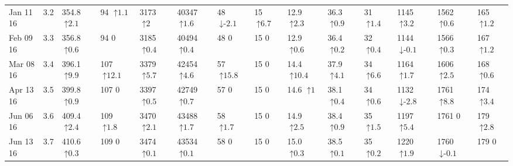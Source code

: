 \begin{tabular}{ll|llllll|lll|lll}
Jan 11 16 & 3.2 & 354.8 {\tiny $\uparrow\text{2.1}$} & 94 {\tiny $\uparrow\text{1.1}$} & 3173 {\tiny $\uparrow\text{2}$} & 40347 {\tiny $\uparrow\text{1.6}$} & 48 {\tiny $\downarrow\text{-}\text{2.1}$} & 15 {\tiny $\uparrow\text{6.7}$} & 12.9 {\tiny $\uparrow\text{2.3}$} & 36.3 {\tiny $\uparrow\text{0.9}$} & 31 {\tiny $\uparrow\text{1.4}$} & 1145 {\tiny $\uparrow\text{3.2}$} & 1562 {\tiny $\uparrow\text{0.6}$} & 165 {\tiny $\uparrow\text{1.2}$} \\
Feb 09 16 & 3.3 & 356.8 {\tiny $\uparrow\text{0.6}$} & 94 {\tiny $\text{0}$} & 3185 {\tiny $\uparrow\text{0.4}$} & 40494 {\tiny $\uparrow\text{0.4}$} & 48 {\tiny $\text{0}$} & 15 {\tiny $\text{0}$} & 12.9 {\tiny $\uparrow\text{0.6}$} & 36.4 {\tiny $\uparrow\text{0.2}$} & 32 {\tiny $\uparrow\text{0.4}$} & 1144 {\tiny $\downarrow\text{-}\text{0.1}$} & 1566 {\tiny $\uparrow\text{0.3}$} & 167 {\tiny $\uparrow\text{1.2}$} \\
Mar 08 16 & 3.4 & 396.1 {\tiny $\uparrow\text{9.9}$} & 107 {\tiny $\uparrow\text{12.1}$} & 3379 {\tiny $\uparrow\text{5.7}$} & 42454 {\tiny $\uparrow\text{4.6}$} & 57 {\tiny $\uparrow\text{15.8}$} & 15 {\tiny $\text{0}$} & 14.4 {\tiny $\uparrow\text{10.4}$} & 37.9 {\tiny $\uparrow\text{4.1}$} & 34 {\tiny $\uparrow\text{6.6}$} & 1164 {\tiny $\uparrow\text{1.7}$} & 1606 {\tiny $\uparrow\text{2.5}$} & 168 {\tiny $\uparrow\text{0.6}$} \\
Apr 13 16 & 3.5 & 399.8 {\tiny $\uparrow\text{0.9}$} & 107 {\tiny $\text{0}$} & 3397 {\tiny $\uparrow\text{0.5}$} & 42749 {\tiny $\uparrow\text{0.7}$} & 57 {\tiny $\text{0}$} & 15 {\tiny $\text{0}$} & 14.6 {\tiny $\uparrow\text{1}$} & 38.1 {\tiny $\uparrow\text{0.4}$} & 34 {\tiny $\uparrow\text{0.6}$} & 1132 {\tiny $\downarrow\text{-}\text{2.8}$} & 1761 {\tiny $\uparrow\text{8.8}$} & 174 {\tiny $\uparrow\text{3.4}$} \\
Jun 06 16 & 3.6 & 409.4 {\tiny $\uparrow\text{2.4}$} & 109 {\tiny $\uparrow\text{1.8}$} & 3470 {\tiny $\uparrow\text{2.1}$} & 43488 {\tiny $\uparrow\text{1.7}$} & 58 {\tiny $\uparrow\text{1.7}$} & 15 {\tiny $\text{0}$} & 14.9 {\tiny $\uparrow\text{2.5}$} & 38.4 {\tiny $\uparrow\text{0.9}$} & 35 {\tiny $\uparrow\text{1.5}$} & 1197 {\tiny $\uparrow\text{5.4}$} & 1761 {\tiny $\text{0}$} & 179 {\tiny $\uparrow\text{2.8}$} \\
Jun 13 16 & 3.7 & 410.6 {\tiny $\uparrow\text{0.3}$} & 109 {\tiny $\text{0}$} & 3474 {\tiny $\uparrow\text{0.1}$} & 43534 {\tiny $\uparrow\text{0.1}$} & 58 {\tiny $\text{0}$} & 15 {\tiny $\text{0}$} & 15.0 {\tiny $\uparrow\text{0.3}$} & 38.5 {\tiny $\uparrow\text{0.1}$} & 35 {\tiny $\uparrow\text{0.2}$} & 1220 {\tiny $\uparrow\text{1.9}$} & 1760 {\tiny $\downarrow\text{-}\text{0.1}$} & 179 {\tiny $\text{0}$} \\

\end{tabular}
